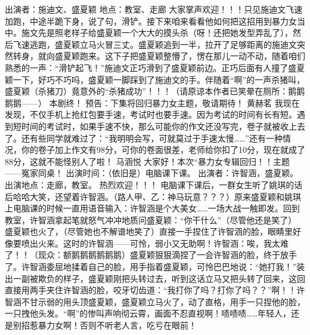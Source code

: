 {}出演者：施迪文、盛夏颖 \markdownRendererInterblockSeparator
{}地点：教室、走廊 \markdownRendererInterblockSeparator
{}大家掌声欢迎！！！只见施迪文飞速加跑，中途半跪下身，说了句，滑铲\markdownRendererTilde{}\markdownRendererTilde{}\markdownRendererTilde{}。接下来咱来看看他如何把这招用到暴力女当中。施文先是照老样子给盛夏颖一个大大的摸头杀（呀！还把她发型弄乱了），然后飞速逃跑，盛夏颖立马火冒三丈。盛夏颖追到一半，拉开了足够距离的施迪文突然转身，就向盛夏颖跑来。这下子把盛夏颖整懵了，愣在那儿一动不动，随着咱们熟悉的一声：“滑铲\markdownRendererTilde{}起飞！”施迪文正巧滑到了盛夏颖前边。正巧后面有人撞了盛夏颖一下，好巧不巧吗，盛夏颖一脚踩到了施迪文的手。伴随着“啊”的一声杀猪叫，盛夏颖（杀猪刀）竟意外的“杀猪成功”！！！（请原谅本作者已笑晕在厕所：鹅鹅鹅鹅——） \markdownRendererInterblockSeparator
{}本剧终！ \markdownRendererInterblockSeparator
{}预告：下集将回归暴力女主题，敬请期待！\markdownRendererInterblockSeparator
{}\markdownRendererInterblockSeparator
{}黄赫茗\markdownRendererInterblockSeparator
{}我现在发现，不仅手机上抢红包要手速，考试时也要手速。因为考试的时间有长有短。遇到短时间的考试时，如果手速不快，那么可能你的作文还没写完，卷子就被收上去了。还有些同学就难过了：“我明明会写，可就莫过于手速太慢……”还有一种情况，你的卷子加上作文有98分，可你的卷面很差，老师给你扣了10分，现在就成了88分，这就不能怪别人了啦！\markdownRendererInterblockSeparator
{}\markdownRendererInterblockSeparator
{}马涵悦\markdownRendererInterblockSeparator
{}大家好！本次“暴力女专辑回归！！主题——冤家同桌！\markdownRendererInterblockSeparator
{}出演时间：（依旧是）电脑课下课。 \markdownRendererInterblockSeparator
{}出演者：许智涵，盛夏颖。\markdownRendererInterblockSeparator
{}出演地点：走廊，教室。 热烈欢迎！！！\markdownRendererInterblockSeparator
{}电脑课下课后，一群女生听了姚琪的话后哈哈大笑，还望着许智涵。（路人甲、乙：神马玩意？？？）原来盛夏颖和姚琪上电脑课的时候一直用语音输入：许智涵是个大美女……一场大战一触即发。回到教室，许智涵拿起笔就怒气冲冲地质问盛夏颖：“你干什么”（尽管他还是笑了） 盛夏颖也火了，（尽管她也不解谱地笑了）直接一手捏住了许智涵的脸，眼睛里好像要喷出火来。这时的许智涵——可怜，弱小又无助啊！许智涵：唉，我太难了！！（现众：额鹅鹅鹅鹅鹅鹅\markdownRendererTilde{}\markdownRendererTilde{}）盛夏颖狠狠滴捏了一会许智涵的脸，终于放手了。许智涵委屈地揉着自己的脸，用手指着盛夏颖，可怜巴巴地说：“她打我！”装出一副被欺负的样子，盛夏颖刚把头转过去，听到这话立马又把头转了回来，这回直接用两手夹住许智涵的脸，咬牙切齿道：“我打你了吗？打你了吗？？”啊！！许智涵不甘示弱的用头顶盛夏颖，盛夏颖立马火了，动了直格，用手一只捏他的脸，一只拽他头发。“啊\markdownRendererTilde{}\markdownRendererTilde{}\markdownRendererTilde{}”的惨叫声响彻云霄，画面不忍直视啊！啧啧啧……年轻人，还是别招惹暴力女啊！否则不听老人言，吃亏在眼前！\markdownRendererInterblockSeparator

